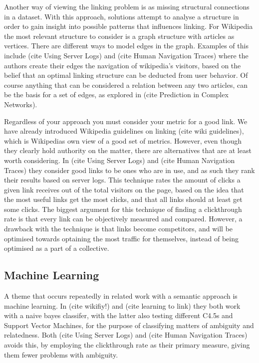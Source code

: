 Another way of viewing the linking problem is as missing structural connections in a dataset. With this approach, solutions attempt to analyse a structure in order to gain insight into possible patterns that influences linking. For Wikipedia the most relevant structure to consider is a graph structure with articles as vertices. There are different ways to model edges in the graph. Examples of this include (cite Using Server Logs) and (cite Human Navigation Traces) where the authors create their edges the navigation of wikipedia's visitors, based on the belief that an optimal linking structure can be deducted from user behavior. Of course anything that can be considered a relation between any two articles, can be the basis for a set of edges, as explored in (cite Prediction in Complex Networks).

Regardless of your approach you must consider your metric for a good link. We have already introduced Wikipedia guidelines on linking (cite wiki guidelines), which is Wikipedias own view of a good set of metrics. However, even though they clearly hold authority on the matter, there are alternatives that are at least worth considering. In (cite Using Server Logs) and (cite Human Navigation Traces) they consider good links to be ones who are in use, and as such they rank their results based on server logs. This technique rates the amount of clicks a given link receives out of the total visitors on the page, based on the idea that the most useful links get the most clicks, and that all links should at least get some clicks. The biggest argument for this technique of finding a clickthrough rate is that every link can be objectively measured and compared. However, a drawback with the technique is that links become competitors, and will be optimised towards optaining the most traffic for themselves, instead of being optimised as a part of a collective.

\subsection{Machine Learning}\label{related_machine_learning}

A theme that occurs repeatedly in related work with a semantic approach is machine learning. In (cite wikifiy!) and (cite learning to link) they both work with a naive bayes classifer, with the latter also testing different C4.5s and Support Vector Machines, for the purpose of classifying matters of ambiguity and relatedness. Both (cite Using Server Logs) and (cite Human Navigation Traces) avoids this, by employing the clickthrough rate as their primary measure, giving them fewer problems with ambiguity.

